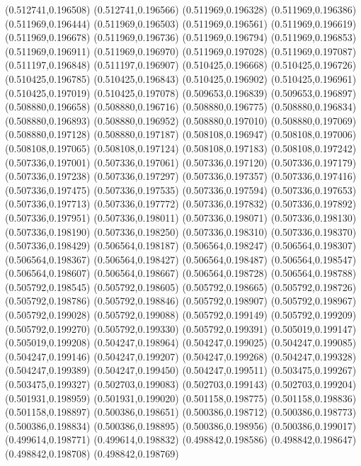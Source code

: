 (0.512741,0.196508)
(0.512741,0.196566)
(0.511969,0.196328)
(0.511969,0.196386)
(0.511969,0.196444)
(0.511969,0.196503)
(0.511969,0.196561)
(0.511969,0.196619)
(0.511969,0.196678)
(0.511969,0.196736)
(0.511969,0.196794)
(0.511969,0.196853)
(0.511969,0.196911)
(0.511969,0.196970)
(0.511969,0.197028)
(0.511969,0.197087)
(0.511197,0.196848)
(0.511197,0.196907)
(0.510425,0.196668)
(0.510425,0.196726)
(0.510425,0.196785)
(0.510425,0.196843)
(0.510425,0.196902)
(0.510425,0.196961)
(0.510425,0.197019)
(0.510425,0.197078)
(0.509653,0.196839)
(0.509653,0.196897)
(0.508880,0.196658)
(0.508880,0.196716)
(0.508880,0.196775)
(0.508880,0.196834)
(0.508880,0.196893)
(0.508880,0.196952)
(0.508880,0.197010)
(0.508880,0.197069)
(0.508880,0.197128)
(0.508880,0.197187)
(0.508108,0.196947)
(0.508108,0.197006)
(0.508108,0.197065)
(0.508108,0.197124)
(0.508108,0.197183)
(0.508108,0.197242)
(0.507336,0.197001)
(0.507336,0.197061)
(0.507336,0.197120)
(0.507336,0.197179)
(0.507336,0.197238)
(0.507336,0.197297)
(0.507336,0.197357)
(0.507336,0.197416)
(0.507336,0.197475)
(0.507336,0.197535)
(0.507336,0.197594)
(0.507336,0.197653)
(0.507336,0.197713)
(0.507336,0.197772)
(0.507336,0.197832)
(0.507336,0.197892)
(0.507336,0.197951)
(0.507336,0.198011)
(0.507336,0.198071)
(0.507336,0.198130)
(0.507336,0.198190)
(0.507336,0.198250)
(0.507336,0.198310)
(0.507336,0.198370)
(0.507336,0.198429)
(0.506564,0.198187)
(0.506564,0.198247)
(0.506564,0.198307)
(0.506564,0.198367)
(0.506564,0.198427)
(0.506564,0.198487)
(0.506564,0.198547)
(0.506564,0.198607)
(0.506564,0.198667)
(0.506564,0.198728)
(0.506564,0.198788)
(0.505792,0.198545)
(0.505792,0.198605)
(0.505792,0.198665)
(0.505792,0.198726)
(0.505792,0.198786)
(0.505792,0.198846)
(0.505792,0.198907)
(0.505792,0.198967)
(0.505792,0.199028)
(0.505792,0.199088)
(0.505792,0.199149)
(0.505792,0.199209)
(0.505792,0.199270)
(0.505792,0.199330)
(0.505792,0.199391)
(0.505019,0.199147)
(0.505019,0.199208)
(0.504247,0.198964)
(0.504247,0.199025)
(0.504247,0.199085)
(0.504247,0.199146)
(0.504247,0.199207)
(0.504247,0.199268)
(0.504247,0.199328)
(0.504247,0.199389)
(0.504247,0.199450)
(0.504247,0.199511)
(0.503475,0.199267)
(0.503475,0.199327)
(0.502703,0.199083)
(0.502703,0.199143)
(0.502703,0.199204)
(0.501931,0.198959)
(0.501931,0.199020)
(0.501158,0.198775)
(0.501158,0.198836)
(0.501158,0.198897)
(0.500386,0.198651)
(0.500386,0.198712)
(0.500386,0.198773)
(0.500386,0.198834)
(0.500386,0.198895)
(0.500386,0.198956)
(0.500386,0.199017)
(0.499614,0.198771)
(0.499614,0.198832)
(0.498842,0.198586)
(0.498842,0.198647)
(0.498842,0.198708)
(0.498842,0.198769)
